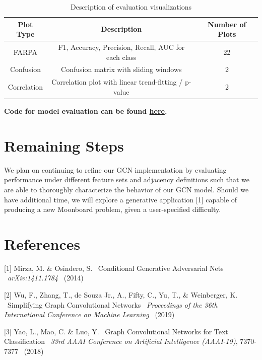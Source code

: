 \documentclass{article}
\begin{document}
\begin{table}[h!]
	\begin{center}
		\begin{tabular}{c|c|c}
		\textbf{Plot Type} & \textbf{Description} & \textbf{Number of Plots}\\	
		\hline
		FARPA & F1, Accuracy, Precision, Recall, AUC for each class & 22\\
		Confusion & Confusion matrix with sliding windows & 2\\
		Correlation & Correlation plot with linear trend-fitting / p-value & 2\\
		\end{tabular}
	\vspace{0.01cm}
	\caption{Description of evaluation visualizations}
	\end{center}
\end{table}

{\small\textbf{Code for model evaluation can be found \href{https://github.com/gestalt-howard/moonGen/blob/master/howard/models_baseline/model_utils/evaluation_tools.py}{here}.}}

\section{Remaining Steps}
We plan on continuing to refine our GCN implementation by evaluating performance under different feature sets and adjacency definitions such that we are able to thoroughly characterize the behavior of our GCN model. Should we have additional time, we will explore a generative application [1] capable of producing a new Moonboard problem, given a user-specified difficulty.

\section*{References}
\medskip
\small

[1] Mirza, M. \& Osindero, S. \ Conditional Generative Adversarial Nets \ {\it arXiv:1411.1784} \ (2014)

[2] Wu, F., Zhang, T., de Souza Jr., A., Fifty, C., Yu, T., \& Weinberger, K. \ Simplifying Graph Convolutional Networks \ {\it Proceedings of the 36th International Conference on Machine Learning} \ (2019)

[3] Yao, L., Mao, C. \& Luo, Y. \ Graph Convolutional Networks for Text Classification \ {\it 33rd AAAI Conference on Artificial Intelligence (AAAI-19)}, 7370-7377 \ (2018)
\end{document}
